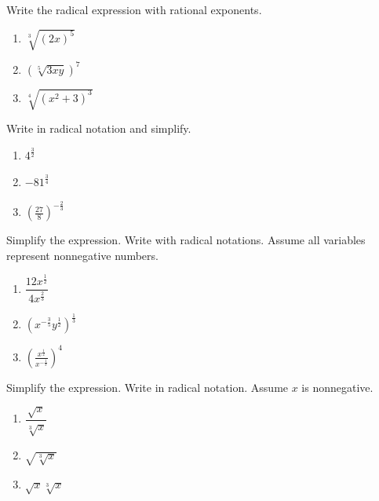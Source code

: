 \documentclass[
  en,11pt]{elegantbook}
\let\BeginKnitrBlock\begin \let\EndKnitrBlock\end
\begin{document}
\BeginKnitrBlock{exercise}
\protect\hypertarget{exr:unnamed-chunk-90}{}{\label{exr:unnamed-chunk-90} }
Write the radical expression with rational exponents.

\begin{enumerate}
\def\labelenumi{\arabic{enumi}.}

\item
  \(\sqrt[3]{(2x)^5}\)
\item
  \((\sqrt[5]{3xy})^7\)
\item
  \(\sqrt[4]{(x^2+3)^3}\)
\end{enumerate}
\EndKnitrBlock{exercise}

\BeginKnitrBlock{exercise}
\protect\hypertarget{exr:unnamed-chunk-91}{}{\label{exr:unnamed-chunk-91} }
Write in radical notation and simplify.

\begin{enumerate}
\def\labelenumi{\arabic{enumi}.}

\item
  \(4^{\frac32}\)
\item
  \(-81^{\frac 34}\)
\item
  \(\left(\frac{27}{8}\right)^{-\frac{2}{3}}\)
\end{enumerate}
\EndKnitrBlock{exercise}

\BeginKnitrBlock{exercise}
\protect\hypertarget{exr:unnamed-chunk-92}{}{\label{exr:unnamed-chunk-92} }
Simplify the expression. Write with radical notations. Assume all variables represent nonnegative numbers.

\begin{enumerate}
\def\labelenumi{\arabic{enumi}.}

\item
  \(\dfrac{12x^{\frac12}}{4x^{\frac23}}\)
\item
  \((x^{-\frac35}y^{\frac12})^{\frac13}\)
\item
  \(\left(\frac{x^{\frac12}}{x^{-\frac13}}\right)^4\)
\end{enumerate}
\EndKnitrBlock{exercise}

\BeginKnitrBlock{exercise}
\protect\hypertarget{exr:unnamed-chunk-93}{}{\label{exr:unnamed-chunk-93} }
Simplify the expression. Write in radical notation. Assume \(x\) is nonnegative.

\begin{enumerate}
\def\labelenumi{\arabic{enumi}.}

\item
  \(\dfrac{\sqrt{x}}{\sqrt[3]{x}}\)
\item
  \(\sqrt{\sqrt[3]{x}}\)
\item
  \(\sqrt{x}\sqrt[3]{x}\)
\end{enumerate}
\EndKnitrBlock{exercise}
\end{document}
